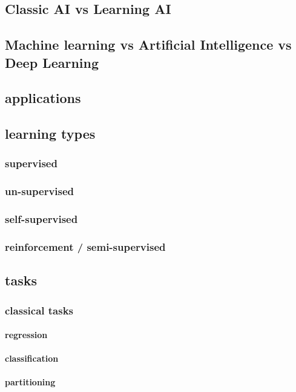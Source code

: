 \subsection{Classic AI vs Learning AI}

\subsection{Machine learning vs Artificial Intelligence vs Deep Learning}

\subsection{applications}

\subsection{learning types}
\subsubsection{supervised}
\subsubsection{un-supervised}
\subsubsection{self-supervised}
\subsubsection{reinforcement / semi-supervised}

\subsection{tasks}
\subsubsection{classical tasks}
\paragraph{regression}
\paragraph{classification}
\paragraph{partitioning}
